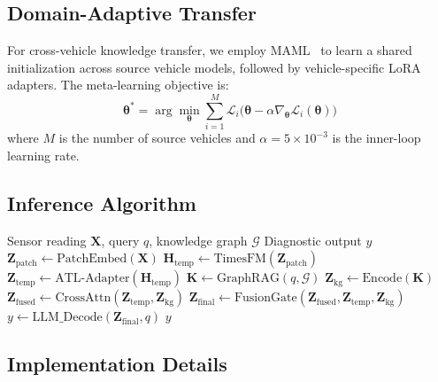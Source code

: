\documentclass[11pt,a4paper]{article}
\begin{document}
\subsection{Domain-Adaptive Transfer}\label{sec:method:transfer}

For cross-vehicle knowledge transfer, we employ MAML~\cite{finn2017maml} to learn a shared initialization across source vehicle models, followed by vehicle-specific LoRA adapters. The meta-learning objective is:
\begin{equation}\label{eq:maml}
\boldsymbol{\theta}^* = \arg\min_{\boldsymbol{\theta}} \sum_{i=1}^{M} \mathcal{L}_i\bigl(\boldsymbol{\theta} - \alpha \nabla_{\boldsymbol{\theta}} \mathcal{L}_i(\boldsymbol{\theta})\bigr)
\end{equation}
where $M$ is the number of source vehicles and $\alpha = 5 \times 10^{-3}$ is the inner-loop learning rate.

\subsection{Inference Algorithm}\label{sec:method:algorithm}

\begin{algorithm}[htbp]
\caption{TKG-Diag Inference Pipeline}\label{alg:inference}
\begin{algorithmic}[1]
\Require Sensor reading $\mathbf{X}$, query $q$, knowledge graph $\mathcal{G}$
\Ensure Diagnostic output $y$
\State $\mathbf{Z}_{\text{patch}} \gets \text{PatchEmbed}(\mathbf{X})$ 
\State $\mathbf{H}_{\text{temp}} \gets \text{TimesFM}(\mathbf{Z}_{\text{patch}})$ 
\State $\mathbf{Z}_{\text{temp}} \gets \text{ATL-Adapter}(\mathbf{H}_{\text{temp}})$ 
\State $\mathbf{K} \gets \text{GraphRAG}(q, \mathcal{G})$ 
\State $\mathbf{Z}_{\text{kg}} \gets \text{Encode}(\mathbf{K})$
\State $\mathbf{Z}_{\text{fused}} \gets \text{CrossAttn}(\mathbf{Z}_{\text{temp}}, \mathbf{Z}_{\text{kg}})$ 
\State $\mathbf{Z}_{\text{final}} \gets \text{FusionGate}(\mathbf{Z}_{\text{fused}}, \mathbf{Z}_{\text{temp}}, \mathbf{Z}_{\text{kg}})$ 
\State $y \gets \text{LLM\_Decode}(\mathbf{Z}_{\text{final}}, q)$
\State \Return $y$
\end{algorithmic}
\end{algorithm}

\subsection{Implementation Details}\label{sec:method:impl}
\end{document}
